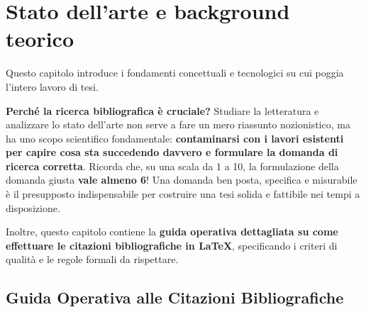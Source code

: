 \chapter{Stato dell'arte e background teorico}
\label{cap:background}

Questo capitolo introduce i fondamenti concettuali e tecnologici su cui poggia l'intero lavoro di tesi. 

\textbf{Perché la ricerca bibliografica è cruciale?} Studiare la letteratura e analizzare lo stato dell'arte non serve a fare un mero riassunto nozionistico, ma ha uno scopo scientifico fondamentale: \textbf{contaminarsi con i lavori esistenti per capire cosa sta succedendo davvero e formulare la domanda di ricerca corretta}. Ricorda che, su una scala da 1 a 10, la formulazione della domanda giusta \textbf{vale almeno 6}! Una domanda ben posta, specifica e misurabile è il presupposto indispensabile per costruire una tesi solida e fattibile nei tempi a disposizione.

Inoltre, questo capitolo contiene la \textbf{guida operativa dettagliata su come effettuare le citazioni bibliografiche in LaTeX}, specificando i criteri di qualità e le regole formali da rispettare.


\section{Guida Operativa alle Citazioni Bibliografiche}
\label{sec:guida-citazioni}

\noindent{}
\vspace{0.4cm}

